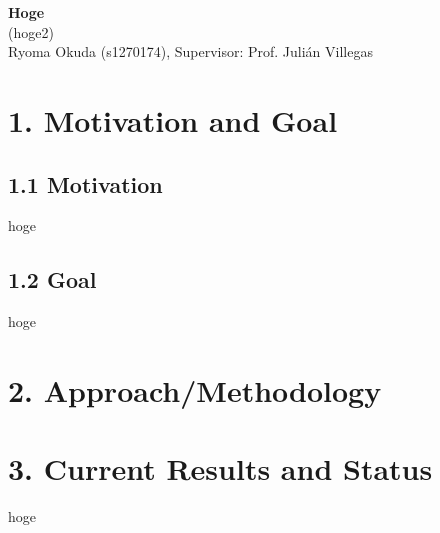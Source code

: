 \documentclass[12pt,a4paper]{article}
\begin{document}
\begin{center}
{\LARGE \textbf{Hoge}}\\
{\large (hoge2)}\\
\vspace{1em}
{\normalsize Ryoma Okuda (s1270174), Supervisor: Prof. Julián Villegas}\\
\end{center}

\begin{multicols}{2}
\section*{1. Motivation and Goal}

\subsection*{1.1 Motivation}
hoge

\subsection*{1.2 Goal}
hoge

\section*{2. Approach/Methodology}

\section*{3. Current Results and Status}
hoge

\end{multicols}
\end{document}
